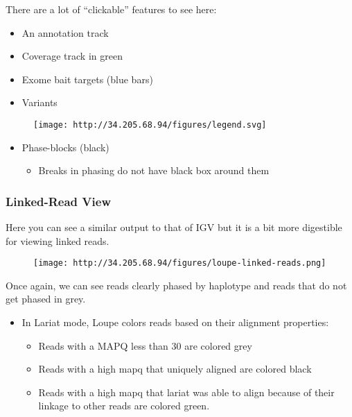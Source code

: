 \documentclass[]{article}
\providecommand{\tightlist}{%
  \setlength{\itemsep}{0pt}\setlength{\parskip}{0pt}}
\begin{document}
There are a lot of ``clickable'' features to see here:

\begin{itemize}
\tightlist
\item
  An annotation track
\item
  Coverage track in green
\item
  Exome bait targets (blue bars)
\item
  Variants
\end{itemize}

\begin{figure}[htbp]
\centering
\texttt{[image: http://34.205.68.94/figures/legend.svg]}
\caption{}
\end{figure}

\begin{itemize}
\tightlist
\item
  Phase-blocks (black)

  \begin{itemize}
  \tightlist
  \item
    Breaks in phasing do not have black box around them
  \end{itemize}
\end{itemize}

\subsubsection{Linked-Read View}\label{linked-read-view}

Here you can see a similar output to that of IGV but it is a bit more
digestible for viewing linked reads.

\begin{figure}[htbp]
\centering
\texttt{[image: http://34.205.68.94/figures/loupe-linked-reads.png]}
\caption{}
\end{figure}

Once again, we can see reads clearly phased by haplotype and reads that
do not get phased in grey.

\begin{itemize}
\tightlist
\item
  In Lariat mode, Loupe colors reads based on their alignment
  properties:

  \begin{itemize}
  \tightlist
  \item
    Reads with a MAPQ less than 30 are colored grey
  \item
    Reads with a high mapq that uniquely aligned are colored black
  \item
    Reads with a high mapq that lariat was able to align because of
    their linkage to other reads are colored green.
  \end{itemize}
\end{itemize}
\end{document}
